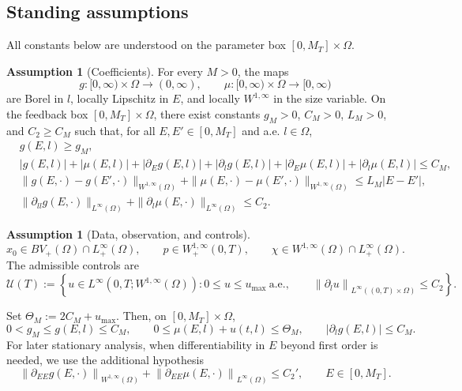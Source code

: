 \documentclass[pdflatex,sn-mathphys-num]{sn-jnl}
\theoremstyle{thmstyleone}
\theoremstyle{definition}
\newtheorem{assumption}[theorem]{Assumption}
\theoremstyle{remark}
\newcommand{\Om}{\Omega}
\newcommand{\Uad}{\mathcal{U}}
\newcommand{\norm}[1]{\left\lVert#1\right\rVert}
\newcommand{\abs}[1]{\left\lvert#1\right\rvert}
\numberwithin{equation}{section}
\begin{document}
\subsection{Standing assumptions}
\label{subsec:model-assumptions}
All constants below are understood on the parameter box
$\displaystyle [0,M_T]\times\Om $.
\begin{assumption}[Coefficients]
\label{ass:model-coefficients}
For every \(M>0\), the maps
\[
g:[0,\infty)\times\Omega\to(0,\infty),
\qquad
\mu:[0,\infty)\times\Omega\to[0,\infty)
\]
are Borel in \(l\), locally Lipschitz in \(E\), and locally
\(W^{1,\infty}\) in the size variable. On the feedback box
\([0,M_T]\times\Omega\), there exist constants
\(g_M>0\), \(C_M>0\), \(L_M>0\), and \(C_2\ge C_M\) such that, for all
\(E,E'\in[0,M_T]\) and a.e. \(l\in\Omega\),
\begin{align}
&g(E,l)\ge g_M, \label{eq:model-ass-gfloor}\\
&|g(E,l)|+|\mu(E,l)|
+|\partial_Eg(E,l)|+|\partial_lg(E,l)|
+|\partial_E\mu(E,l)|+|\partial_l\mu(E,l)|
\le C_M, \label{eq:model-ass-first}\\
&\|g(E,\cdot)-g(E',\cdot)\|_{W^{1,\infty}(\Omega)}
+
\|\mu(E,\cdot)-\mu(E',\cdot)\|_{W^{1,\infty}(\Omega)}
\le L_M|E-E'|, \label{eq:model-ass-Elip}\\
&\|\partial_{ll}g(E,\cdot)\|_{L^\infty(\Omega)}
+
\|\partial_l\mu(E,\cdot)\|_{L^\infty(\Omega)}
\le C_2 . \label{eq:model-ass-second}
\end{align}
\end{assumption}
\begin{assumption}[Data, observation, and controls]
\label{ass:model-data}
\[
x_0\in BV_+(\Omega)\cap L^\infty_+(\Omega),
\qquad
p\in W^{1,\infty}_+(0,T),
\qquad
\chi\in W^{1,\infty}(\Omega)\cap L^\infty_+(\Omega).
\]
The admissible controls are
\[
\Uad(T):=
\left\{
u\in L^\infty(0,T;W^{1,\infty}(\Om)):
0\le u\le u_{\max}\ \text{a.e.},
\qquad
\norm{\partial_l u}_{L^\infty((0,T)\times\Om)}\le C_2
\right\}.
\]
\end{assumption}
Set
$\displaystyle \Theta_M:=2C_M+u_{\max}$.
Then, on \([0,M_T]\times\Om\),
\begin{equation}
\label{eq:model-basic-bounds}
0<g_M\le g(E,l)\le C_M,
\qquad
0\le \mu(E,l)+u(t,l)\le \Theta_M,
\qquad
\abs{\partial_l g(E,l)}\le C_M .
\end{equation}
For later stationary analysis, when differentiability in \(E\) beyond first order
is needed, we use the additional hypothesis
\begin{equation}
\label{eq:model-C2E}
\norm{\partial_{EE}g(E,\cdot)}_{W^{1,\infty}(\Om)}
+
\norm{\partial_{EE}\mu(E,\cdot)}_{L^\infty(\Om)}
\le C_2',
\qquad
E\in[0,M_T].
\end{equation}
\end{document}
